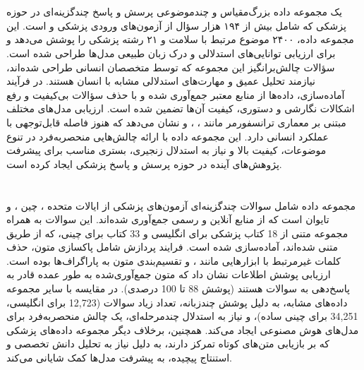 \documentclass[11pt, a4paper, oneside]{book}
\begin{document}
		\section{}
			یک مجموعه داده بزرگ‌مقیاس و چندموضوعی پرسش و پاسخ چندگزینه‌ای در حوزه پزشکی که شامل بیش از ۱۹۴ هزار سؤال از آزمون‌های ورودی پزشکی  و  است. این مجموعه داده، ۲۴۰۰ موضوع مرتبط با سلامت و ۲۱ رشته پزشکی را پوشش می‌دهد و برای ارزیابی توانایی‌های استدلالی و درک زبان طبیعی مدل‌ها طراحی شده است. سؤالات چالش‌برانگیز این مجموعه که توسط متخصصان انسانی طراحی شده‌اند، نیازمند تحلیل عمیق و مهارت‌های استدلالی مشابه با انسان هستند. در فرآیند آماده‌سازی، داده‌ها از منابع معتبر جمع‌آوری شده و با حذف سؤالات بی‌کیفیت و رفع اشکالات نگارشی و دستوری، کیفیت آن‌ها تضمین شده است. ارزیابی مدل‌های مختلف مبتنی بر معماری ترانسفورمر مانند ، ،  و  نشان می‌دهد که هنوز فاصله قابل‌توجهی با عملکرد انسانی دارد. این مجموعه داده با ارائه چالش‌هایی منحصربه‌فرد در تنوع موضوعات، کیفیت بالا و نیاز به استدلال زنجیری، بستری مناسب برای پیشرفت پژوهش‌های آینده در حوزه پرسش و پاسخ پزشکی ایجاد کرده است. \cite{pal_medmcqa_2022}
		
				
		\section{}
			مجموعه داده  شامل سوالات چندگزینه‌ای آزمون‌های پزشکی از ایالات متحده ، چین ، و تایوان  است که از منابع آنلاین و رسمی جمع‌آوری شده‌اند. این سوالات به همراه مجموعه متنی از 18 کتاب پزشکی برای انگلیسی و 33 کتاب برای چینی، که از طریق  متنی شده‌اند، آماده‌سازی شده است. فرایند پردازش شامل پاکسازی متون، حذف کلمات غیرمرتبط با ابزارهایی مانند ، و تقسیم‌بندی متون به پاراگراف‌ها بوده است. ارزیابی پوشش اطلاعات نشان داد که متون جمع‌آوری‌شده به طور عمده قادر به پاسخ‌دهی به سوالات هستند (پوشش 88 تا 100 درصدی).  در مقایسه با سایر مجموعه داده‌های مشابه، به دلیل پوشش چندزبانه، تعداد زیاد سوالات (12,723 برای انگلیسی، 34,251 برای چینی ساده)، و نیاز به استدلال چندمرحله‌ای، یک چالش منحصربه‌فرد برای مدل‌های هوش مصنوعی ایجاد می‌کند. همچنین، برخلاف دیگر مجموعه داده‌های پزشکی که بر بازیابی متن‌های کوتاه تمرکز دارند،  به دلیل نیاز به تحلیل دانش تخصصی و استنتاج پیچیده، به پیشرفت مدل‌ها کمک شایانی می‌کند. \cite{jin_what_2020}
		
\end{document}
